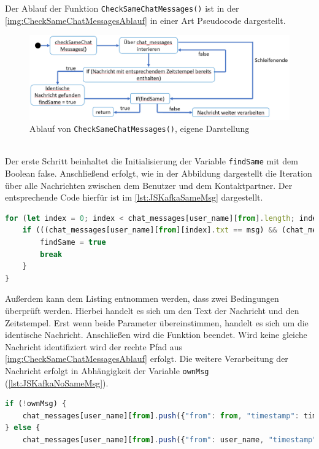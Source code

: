 \documentclass[a4paper,titlepage,halfparskip,12pt]{scrreprt}
\begin{document}
\begin{onehalfspacing}
\pagebreak

Der Ablauf der Funktion \texttt{CheckSameChatMessages()} ist in der \autoref{img:CheckSameChatMessagesAblauf} in einer Art Pseudocode dargestellt.
\begin{figure}[h]
	\centering
	\includegraphics[scale=0.5]{images/CheckSameChatMessagesAblauf}
	\caption{Ablauf von \texttt{CheckSameChatMessages()}, eigene Darstellung}
	\label{img:CheckSameChatMessagesAblauf}
\end{figure}\\
Der erste Schritt beinhaltet die Initialisierung der Variable \texttt{findSame} mit dem Boolean false. Anschließend erfolgt, wie in der Abbildung dargestellt die Iteration über alle Nachrichten zwischen dem Benutzer und dem Kontaktpartner. Der entsprechende Code hierfür ist im \autoref{lst:JSKafkaSameMsg} dargestellt.
\begin{lstlisting}[language=Javascript,caption=Suchen der identischen Nachricht,label={lst:JSKafkaSameMsg}]
for (let index = 0; index < chat_messages[user_name][from].length; index++) {
	if (((chat_messages[user_name][from][index].txt == msg) && (chat_messages[user_name][from][index].timestamp == timestamp))) {
		findSame = true
		break
	}
}
\end{lstlisting}
Außerdem kann dem Listing entnommen werden, dass zwei Bedingungen überprüft werden. Hierbei handelt es sich um den Text der Nachricht und den Zeitstempel. Erst wenn beide Parameter übereinstimmen, handelt es sich um die identische Nachricht. Anschließen wird die Funktion beendet. Wird keine gleiche Nachricht identifiziert wird der rechte Pfad aus \autoref{img:CheckSameChatMessagesAblauf} erfolgt. Die weitere Verarbeitung der Nachricht erfolgt in Abhängigkeit der Variable \texttt{ownMsg} (\autoref{lst:JSKafkaNoSameMsg}).
\begin{lstlisting}[language=Javascript,caption=Weitere Verarbeitung der Nachricht,label={lst:JSKafkaNoSameMsg}]
if (!ownMsg) {
	chat_messages[user_name][from].push({"from": from, "timestamp": timestamp, "txt": msg, "type": "chat"});
} else {
	chat_messages[user_name][from].push({"from": user_name, "timestamp": timestamp, "txt": msg, "type": "chat"}); 

\end{lstlisting}
\end{onehalfspacing}
\end{document}
